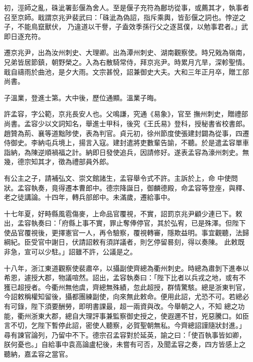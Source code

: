 \begin{pinyinscope}
 初，涇師之亂，硃泚署彭偃為舍人。至是偃子充符為鄜坊從事，或薦其才，執事者召至京師。戢謂京兆尹裴武曰：「硃泚為偽詔，指斥乘輿，皆彭偃之詞也。悖逆之子，不能鳥竄獸伏，
 乃違道以干譽，子盍效季孫行父之逐莒僕，以勉事君者。」武即日逐充符。



 遷京兆尹，出為汝州刺史、大理卿。出為潭州刺史、湖南觀察使。時兄戣為嶺南，兄弟皆居節鎮，朝野榮之。入為右散騎常侍，拜京兆尹。時累月亢旱，深軫聖情。戢自禱雨於曲池，是夕大雨。文宗甚悅，詔兼御史大夫。大和三年正月卒，贈工部尚書。



 子溫業，登進士第。大中後，歷位通顯。溫業子晦。



 許孟容，字公範，京兆長安人也。父鳴謙，究通《易象》，官至
 撫州刺史，贈禮部尚書。孟容少以文詞知名，舉進士甲科，後究《王氏易》登科，授秘書省校書郎。趙贊為荊、襄等道黜陟使，表為判官。貞元初，徐州節度使張建封闢為從事，四遷侍御史。李納屯兵境上，揚言入寇。建封遣將吏數輩告諭，不聽。於是遣孟容單車詣納，為陳逆順禍福之計。納即日發使追兵，因請修好。遂表孟容為濠州刺史。無幾，德宗知其才，徵為禮部員外郎。



 有公主之子，請補弘文、崇文館諸生，孟容舉令式不許。主訴於上，命
 中使問狀。孟容執奏，竟得遷本曹郎中。德宗降誕日，御麟德殿，命孟容等登座，與釋、老之徒講論。十四年，轉兵部郎中。未滿歲，遷給事中。



 十七年夏，好畤縣風雹傷麥，上命品官覆視，不實，詔罰京兆尹顧少連已下。敕出，孟容執奏曰：「府縣上事不實，罪止奪俸停官，其於弘宥，已是殊澤。但陛下使品官覆視後，更擇憲官一人，再令驗察，覆視轉審，隱欺益明。事宜觀聽，法歸綱紀。臣受官中謝日，伏請詔敕有須詳議者，則乞停留晷刻，得以奏陳。
 此敕既非急，宣可以少駐。」詔雖不許，公議是之。



 十八年，浙江東道觀察使裴肅卒，以攝副使齊總為衢州刺史。時總為肅剝下進奉以希恩，遽授大郡，物議喧然。詔出，孟容執奏曰：「陛下比者以兵戎之地，或有不獲已超授者。今衢州無他虞，齊總無殊績，忽此超授，群情驚駭。總是浙東判官，今詔敕稱權知留後，攝都團練副使，向來無此敕命。便用此詔，尤恐不可。若總必有可錄，陛下須要酬勞，即明書課最，超一兩資與改。今舉朝之人，不知
 總之功能，衢州浙東大郡，總自大理評事兼監察御史授之，使遐邇不甘，兇惡騰口。如臣言不切，乞陛下暫停此詔，密使人聽察，必賀聖朝無私。今齊總詔謹隨狀封進。」尋有諫官論列，乃留中不下。德宗召孟容對於延英，諭之曰：「使百執事皆如卿，朕何憂也。」自給事中袁高論盧杞後，未嘗有可否，及聞孟容之奏，四方皆感上之聽納，嘉孟容之當官。




\end{pinyinscope}
